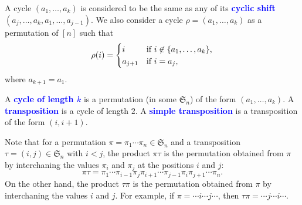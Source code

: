 \documentclass[oneside]{book}
\numberwithin{equation}{section}
\theoremstyle{definition}
\newcommand\sym{\mathfrak{S}}
\renewcommand\emph[1]{\textcolor{blue}{\bf #1}}
\begin{document}
A cycle \( (a_1,\dots,a_k) \) is considered to be the same as any of
its \emph{cyclic shift} \( (a_j,\dots, a_k, a_1, \dots,a_{j-1}) \). We
also consider a cycle \( \rho=(a_1,\dots,a_k) \) as a permutation of
\( [n] \) such that
\[
  \rho(i) =
  \begin{cases}
   i & \mbox{if \( i\not\in \{a_1,\dots,a_k\} \)},\\
    a_{j+1} & \mbox{if \( i=a_j \),}
  \end{cases}
\]
where \( a_{k+1} = a_1 \).

A \emph{cycle of length \( k \)} is a permutation (in some
\( \sym_n \)) of the form \( (a_1,\dots,a_k) \). A
\emph{transposition} is a cycle of length \( 2 \). A \emph{simple
  transposition} is a transposition of the form \( (i,i+1) \).

Note that for a permutation \( \pi = \pi_1 \cdots \pi_n \in \sym_n \)
and a transposition \( \tau = (i,j)\in \sym_n \) with \( i<j \), the
product \( \pi\tau \) is the permutation obtained from \( \pi \)
by interchaning the values \( \pi_i \) and \( \pi_j \) at the
positions \( i \) and \( j \):
\[
  \pi\tau = \pi_1 \cdots \pi_{i-1} \pi_j \pi_{i+1} \cdots \pi_{j-1}
  \pi_i \pi_{j+1} \cdots \pi_n.
\]
On the other hand, the product \( \tau\pi \) is the permutation
obtained from \( \pi \) by interchaning the values \( i \) and
\( j \). For example, if \( \pi = \cdots i \cdots j \cdots \), then
\( \tau\pi = \cdots j \cdots i \cdots \).
\end{document}
